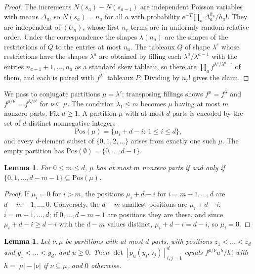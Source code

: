 \documentclass[11pt]{amsart}
\newtheorem{lemma}[theorem]{Lemma}
\theoremstyle{remark}
\numberwithin{equation}{section}
\begin{document}
\begin{proof}
The increments $N(s_a)-N(s_{a-1})$ are independent Poisson variables with means $\Delta_a$, so $N(s_a)=n_a$ for all $a$ with probability $e^{-T}\prod_a\Delta_a^{h_a}/h_a!$. They are independent of $(U_n)$, whose first $n_r$ terms are in uniformly random relative order. Under the correspondence the shapes $\lambda(n_a)$ are the shapes of the restrictions of $Q$ to the entries at most $n_a$. The tableaux $Q$ of shape $\lambda^r$ whose restrictions have the shapes $\lambda^a$ are obtained by filling each $\lambda^a/\lambda^{a-1}$ with the entries $n_{a-1}+1,\dots,n_a$ as a standard skew tableau, so there are $\prod_af^{\lambda^a/\lambda^{a-1}}$ of them, and each is paired with $f^{\lambda^r}$ tableaux $P$. Dividing by $n_r!$ gives the claim.
\end{proof}

We pass to conjugate partitions $\mu=\lambda'$; transposing fillings shows $f^{\mu}=f^{\lambda}$ and $f^{\mu/\nu}=f^{\lambda/\nu'}$ for $\nu\subseteq\mu$. The condition $\lambda_1\le m$ becomes $\mu$ having at most $m$ nonzero parts. Fix $d\ge1$. A partition $\mu$ with at most $d$ parts is encoded by the set of $d$ distinct nonnegative integers
\[
\mathrm{Pos}(\mu)=\{\mu_i+d-i:\ 1\le i\le d\},
\]
and every $d$-element subset of $\{0,1,2,\dots\}$ arises from exactly one such $\mu$. The empty partition has $\mathrm{Pos}(\emptyset)=\{0,\dots,d-1\}$.

\begin{lemma}\label{lem:occ}
For $0\le m\le d$, $\mu$ has at most $m$ nonzero parts if and only if $\{0,1,\dots,d-m-1\}\subseteq\mathrm{Pos}(\mu)$.
\end{lemma}

\begin{proof}
If $\mu_i=0$ for $i>m$, the positions $\mu_i+d-i$ for $i=m+1,\dots,d$ are $d-m-1,\dots,0$. Conversely, the $d-m$ smallest positions are $\mu_i+d-i$, $i=m+1,\dots,d$; if $0,\dots,d-m-1$ are positions they are these, and since $\mu_i+d-i\ge d-i$ with the $d-m$ values distinct, $\mu_i+d-i=d-i$, so $\mu_i=0$.
\end{proof}

\begin{lemma}\label{lem:aitken}
Let $\nu,\mu$ be partitions with at most $d$ parts, with positions $z_1<\dots<z_d$ and $y_1<\dots<y_d$, and $u\ge0$. Then $\det[p_u(y_i,z_j)]_{i,j=1}^d$ equals $f^{\mu/\nu}u^h/h!$ with $h=|\mu|-|\nu|$ if $\nu\subseteq\mu$, and $0$ otherwise.
\end{lemma}
\end{document}

